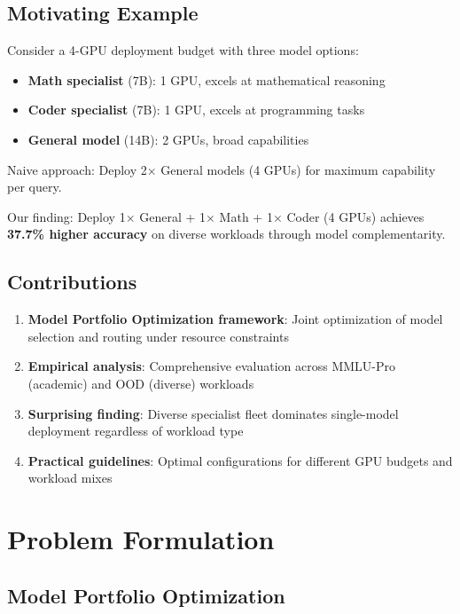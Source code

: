 \documentclass[11pt,a4paper]{article}
\begin{document}
\subsection{Motivating Example}

Consider a 4-GPU deployment budget with three model options:
\begin{itemize}
    \item \textbf{Math specialist} (7B): 1 GPU, excels at mathematical reasoning
    \item \textbf{Coder specialist} (7B): 1 GPU, excels at programming tasks
    \item \textbf{General model} (14B): 2 GPUs, broad capabilities
\end{itemize}

Naive approach: Deploy 2$\times$ General models (4 GPUs) for maximum capability per query.

Our finding: Deploy 1$\times$ General + 1$\times$ Math + 1$\times$ Coder (4 GPUs) achieves \textbf{37.7\% higher accuracy} on diverse workloads through model complementarity.

\subsection{Contributions}

\begin{enumerate}
    \item \textbf{Model Portfolio Optimization framework}: Joint optimization of model selection and routing under resource constraints
    \item \textbf{Empirical analysis}: Comprehensive evaluation across MMLU-Pro (academic) and OOD (diverse) workloads
    \item \textbf{Surprising finding}: Diverse specialist fleet dominates single-model deployment regardless of workload type
    \item \textbf{Practical guidelines}: Optimal configurations for different GPU budgets and workload mixes
\end{enumerate}

\section{Problem Formulation}

\subsection{Model Portfolio Optimization}
\end{document}

